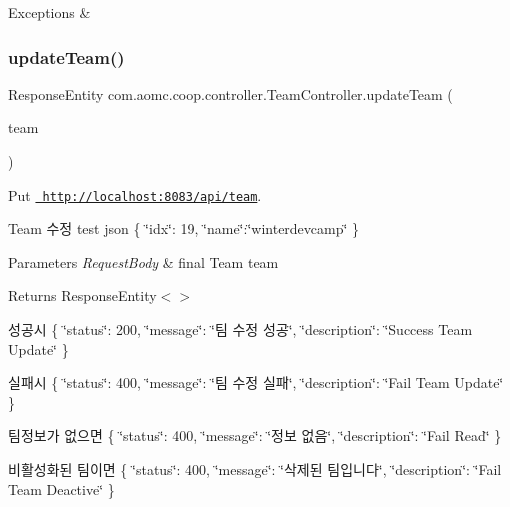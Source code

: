 \begin{DoxyExceptions}{Exceptions}
{\em } & \\
\hline
\end{DoxyExceptions}
\mbox{\label{classcom_1_1aomc_1_1coop_1_1controller_1_1_team_controller_ad03a0ca2d1d0680848a5efef33934941}} 
\subsubsection{\texorpdfstring{updateTeam()}{updateTeam()}}
{\footnotesize\ttfamily Response\+Entity com.\+aomc.\+coop.\+controller.\+Team\+Controller.\+update\+Team (\begin{DoxyParamCaption}\item[{@Request\+Body final Team}]{team }\end{DoxyParamCaption})}



Put \href{http://localhost:8083/api/team}{\texttt{ http\+://localhost\+:8083/api/team}}. 

Team 수정 test json \{ \char`\"{}idx\char`\"{}\+: 19, \char`\"{}name\char`\"{}\+:\char`\"{}winterdevcamp\char`\"{} \}


\begin{DoxyParams}{Parameters}
{\em Request\+Body} & final Team team\\
\hline
\end{DoxyParams}
\begin{DoxyReturn}{Returns}
Response\+Entity$<$$>$
\end{DoxyReturn}
성공시 \{ \char`\"{}status\char`\"{}\+: 200, \char`\"{}message\char`\"{}\+: \char`\"{}팀 수정 성공\char`\"{}, \char`\"{}description\char`\"{}\+: \char`\"{}\+Success Team Update\char`\"{} \}

실패시 \{ \char`\"{}status\char`\"{}\+: 400, \char`\"{}message\char`\"{}\+: \char`\"{}팀 수정 실패\char`\"{}, \char`\"{}description\char`\"{}\+: \char`\"{}\+Fail Team Update\char`\"{} \}

팀정보가 없으면 \{ \char`\"{}status\char`\"{}\+: 400, \char`\"{}message\char`\"{}\+: \char`\"{}정보 없음\char`\"{}, \char`\"{}description\char`\"{}\+: \char`\"{}\+Fail Read\char`\"{} \}

비활성화된 팀이면 \{ \char`\"{}status\char`\"{}\+: 400, \char`\"{}message\char`\"{}\+: \char`\"{}삭제된 팀입니다\char`\"{}, \char`\"{}description\char`\"{}\+: \char`\"{}\+Fail Team Deactive\char`\"{} \}


